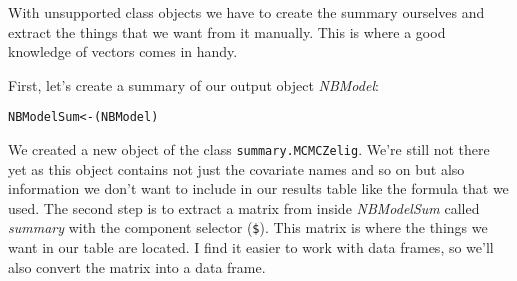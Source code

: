 With unsupported class objects we have to create the summary ourselves and extract the things that we want from it manually. This is where a good knowledge of vectors comes in handy. 

First, let's create a summary of our output object {\emph{NBModel}}:

\begin{knitrout}
\color{fgcolor}\begin{kframe}
\begin{alltt}
NBModelSum <- (NBModel)
\end{alltt}
\end{kframe}
\end{knitrout}


We created a new object of the class {\tt{summary.MCMCZelig}}. We're still not there yet as this object contains not just the covariate names and so on but also information we don't want to include in our results table like the formula that we used. The second step is to extract a matrix from inside {\emph{NBModelSum}} called {\emph{summary}} with the component selector ({\tt{\$}}). This matrix is where the things we want in our table are located. I find it easier to work with data frames, so we'll also convert the matrix into a data frame.







